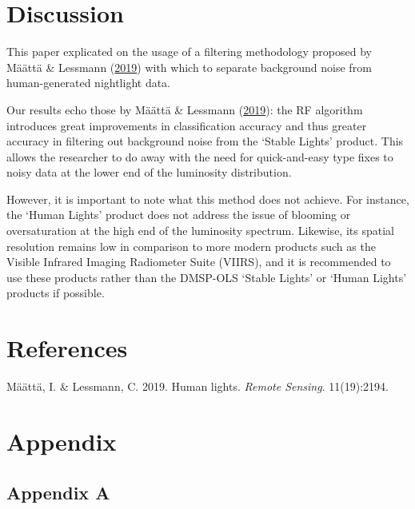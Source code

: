 \documentclass[11pt,preprint, authoryear]{elsarticle}
\numberwithin{equation}{section}
\numberwithin{figure}{section}
\numberwithin{table}{section}
\newlength{\cslhangindent}
\newenvironment{CSLReferences}%
  {\setlength{\parindent}{0pt}%
  \everypar{\setlength{\hangindent}{\cslhangindent}}\ignorespaces}%
  {\par}
\begin{document}
\hypertarget{discussion}{%
\section{\texorpdfstring{Discussion
\label{Conclusion}}{Discussion }}\label{discussion}}

This paper explicated on the usage of a filtering methodology proposed
by Määttä \& Lessmann (\protect\hyperlink{ref-maatta}{2019}) with which
to separate background noise from human-generated nightlight data.

Our results echo those by Määttä \& Lessmann
(\protect\hyperlink{ref-maatta}{2019}): the RF algorithm introduces
great improvements in classification accuracy and thus greater accuracy
in filtering out background noise from the `Stable Lights' product. This
allows the researcher to do away with the need for quick-and-easy type
fixes to noisy data at the lower end of the luminosity distribution.

However, it is important to note what this method does not achieve. For
instance, the `Human Lights' product does not address the issue of
blooming or oversaturation at the high end of the luminosity spectrum.
Likewise, its spatial resolution remains low in comparison to more
modern products such as the Visible Infrared Imaging Radiometer Suite
(VIIRS), and it is recommended to use these products rather than the
DMSP-OLS `Stable Lights' or `Human Lights' products if possible.

\newpage

\hypertarget{references}{%
\section*{References}\label{references}}

\hypertarget{refs}{}
\begin{CSLReferences}{1}{0}
\leavevmode{}%
Määttä, I. \& Lessmann, C. 2019. Human lights. \emph{Remote Sensing}.
11(19):2194.

\end{CSLReferences}

\hypertarget{appendix}{%
\section*{Appendix}\label{appendix}}

\hypertarget{appendix-a}{%
\subsection*{Appendix A}\label{appendix-a}}


\end{document}
